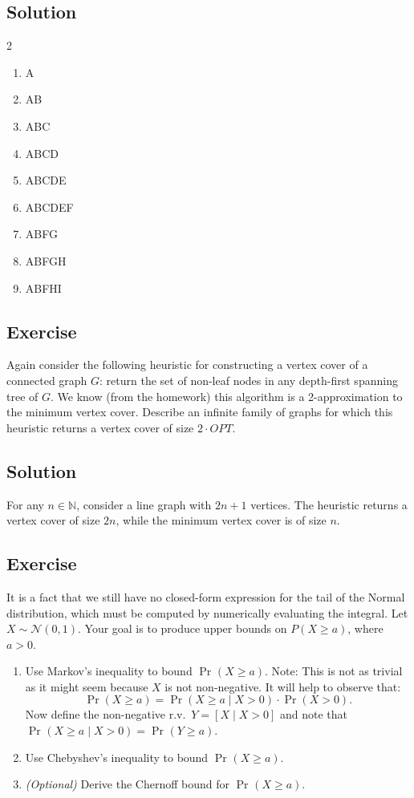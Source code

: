 \documentclass[14pt]{extreport}
\newcounter{counter}
\newcommand{\Exercise}{Exercise \stepcounter{counter}\thecounter}
\renewcommand{\Pr}[2][]{\operatorname{Pr}_{#1}\left(#2\right)}
\begin{document}
\subsection*{Solution}
    \begin{multicols}{2}
    \begin{enumerate}[label=\arabic*.]
    \small
        \item A
        \item AB
        \item ABC
        \item ABCD
        \item ABCDE
        \item AB\textcolor{gray!50}{CDE}F
        \item ABFG
        \item ABF\textcolor{gray!50}{G}H
        \item ABF\textcolor{gray!50}{H}I
    \end{enumerate}
    \end{multicols}
    
\subsection*{\Exercise}
    Again consider the following heuristic for constructing a vertex cover of a connected graph $G$: return the set of non-leaf nodes in any depth-first spanning tree of $G$. We know (from the homework) this algorithm is a 2-approximation to the minimum vertex cover. Describe an infinite family of graphs for which this heuristic returns a vertex cover of size $2 \cdot OPT$.

\subsection*{Solution}
    For any $n \in \mathbb{N}$, consider a line graph with $2n + 1$ vertices. The heuristic returns a vertex cover of size $2n$, while the minimum vertex cover is of size $n$.

\subsection*{\Exercise}
    It is a fact that we still have no closed-form expression for the tail of the Normal distribution, which must be computed by numerically evaluating the integral. Let \(X \sim \mathcal{N}(0,1)\). Your goal is to produce upper bounds on \(P(X \geq a)\), where \(a > 0\).
    \begin{enumerate}
        \item Use Markov's inequality to bound \(\Pr{X \geq a}\). Note: This is not as trivial as it might seem because \(X\) is not non-negative. It will help to observe that:
        \[
        \Pr{X \geq a} = \Pr{X \geq a \mid X > 0} \cdot \Pr{X > 0}.
        \]
        Now define the non-negative r.v.\ \( Y = [X \mid X > 0] \) and note that \(\Pr{X \geq a \mid X > 0} = \Pr{Y \geq a}\).
        \item Use Chebyshev’s inequality to bound \(\Pr{X \geq a}\).
        \item \textit{(Optional)} Derive the Chernoff bound for \(\Pr{X \geq a}\).
    \end{enumerate}
\end{document}
